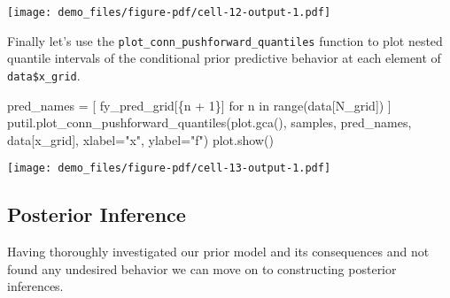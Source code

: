 \documentclass[
  letterpaper,
  DIV=11,
  numbers=noendperiod]{scrartcl}
\newenvironment{Shaded}{\begin{snugshade}}{\end{snugshade}}
\newcommand{\BuiltInTok}[1]{\textcolor[rgb]{0.00,0.23,0.31}{#1}}
\newcommand{\ControlFlowTok}[1]{\textcolor[rgb]{0.00,0.23,0.31}{#1}}
\newcommand{\DecValTok}[1]{\textcolor[rgb]{0.68,0.00,0.00}{#1}}
\newcommand{\KeywordTok}[1]{\textcolor[rgb]{0.00,0.23,0.31}{#1}}
\newcommand{\NormalTok}[1]{\textcolor[rgb]{0.00,0.23,0.31}{#1}}
\newcommand{\OperatorTok}[1]{\textcolor[rgb]{0.37,0.37,0.37}{#1}}
\newcommand{\SpecialCharTok}[1]{\textcolor[rgb]{0.37,0.37,0.37}{#1}}
\newcommand{\SpecialStringTok}[1]{\textcolor[rgb]{0.13,0.47,0.30}{#1}}
\newcommand{\StringTok}[1]{\textcolor[rgb]{0.13,0.47,0.30}{#1}}
\begin{document}
\texttt{[image: demo\_files/figure-pdf/cell-12-output-1.pdf]}

Finally let's use the \texttt{plot\_conn\_pushforward\_quantiles}
function to plot nested quantile intervals of the conditional prior
predictive behavior at each element of \texttt{data\$x\_grid}.

\begin{Shaded}
\begin{Highlighting}[]
\NormalTok{pred\_names }\OperatorTok{=}\NormalTok{ [ }\SpecialStringTok{f\textquotesingle{}y\_pred\_grid[}\SpecialCharTok{\{}\NormalTok{n }\OperatorTok{+} \DecValTok{1}\SpecialCharTok{\}}\SpecialStringTok{]\textquotesingle{}} \ControlFlowTok{for}\NormalTok{ n }\KeywordTok{in} \BuiltInTok{range}\NormalTok{(data[}\StringTok{\textquotesingle{}N\_grid\textquotesingle{}}\NormalTok{]) ]}
\NormalTok{putil.plot\_conn\_pushforward\_quantiles(plot.gca(), samples,}
\NormalTok{                                      pred\_names, data[}\StringTok{\textquotesingle{}x\_grid\textquotesingle{}}\NormalTok{],}
\NormalTok{                                      xlabel}\OperatorTok{=}\StringTok{"x"}\NormalTok{, ylabel}\OperatorTok{=}\StringTok{"f"}\NormalTok{)}
\NormalTok{plot.show()}
\end{Highlighting}
\end{Shaded}

\texttt{[image: demo\_files/figure-pdf/cell-13-output-1.pdf]}

\subsection{Posterior Inference}\label{posterior-inference}

Having thoroughly investigated our prior model and its consequences and
not found any undesired behavior we can move on to constructing
posterior inferences.
\end{document}
